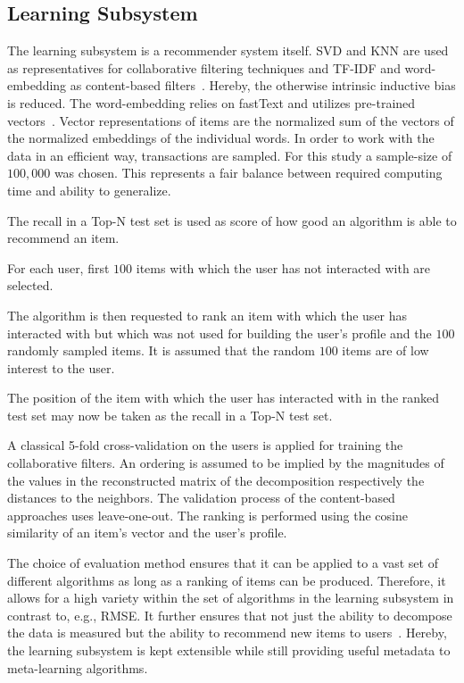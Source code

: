 \documentclass[runningheads]{llncs}
\begin{document}
\subsection{Learning Subsystem}
The learning subsystem is a recommender system itself. SVD and KNN are used as representatives for collaborative filtering techniques and TF-IDF and word-embedding as content-based filters~\cite{scikit-learn,rehurek_lrec}. Hereby, the otherwise intrinsic inductive bias is reduced. The word-embedding relies on fastText and utilizes pre-trained vectors~\cite{DBLP:journals/corr/BojanowskiGJM16}. Vector representations of items are the normalized sum of the vectors of the normalized embeddings of the individual words. In order to work with the data in an efficient way, transactions are sampled. For this study a sample-size of $100,000$ was chosen. This represents a fair balance between required computing time and ability to generalize.

The recall in a Top-N test set is used as score of how good an algorithm is able to recommend an item.
\begin{enumerate*}[label= (\arabic*)]
	\item For each user, first $100$ items with which the user has not interacted with are selected.
	\item The algorithm is then requested to rank an item with which the user has interacted with but which was not used for building the user's profile and the $100$ randomly sampled items. It is assumed that the random $100$ items are of low interest to the user.
	\item The position of the item with which the user has interacted with in the ranked test set may now be taken as the recall in a Top-N test set.
\end{enumerate*}

A classical 5-fold cross-validation on the users is applied for training the collaborative filters. An ordering is assumed to be implied by the magnitudes of the values in the reconstructed matrix of the decomposition respectively the distances to the neighbors. The validation process of the content-based approaches uses leave-one-out. The ranking is performed using the cosine similarity of an item's vector and the user's profile.

The choice of evaluation method ensures that it can be applied to a vast set of different algorithms as long as a ranking of items can be produced. Therefore, it allows for a high variety within the set of algorithms in the learning subsystem in contrast to, e.g., RMSE. It further ensures that not just the ability to decompose the data is measured but the ability to recommend new items to users~\cite{Cremonesi:2010:PRA:1864708.1864721}. Hereby, the learning subsystem is kept extensible while still providing useful metadata to meta-learning algorithms.
\end{document}

